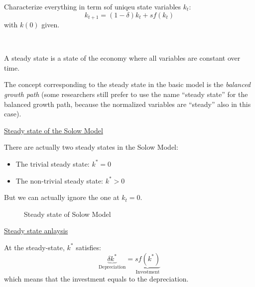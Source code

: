 Characterize everything in term sof uniqeu state variables $k_t$:
\[k_{t+1} = (1 - \delta)k_t + sf(k_t)\]
with $k(0)$ given.

\begin{definition}
    \

    A steady state is a state of the economy where all variables are constant over time.

    The concept corresponding to the steady state in the basic model is the \textit{balanced 
    growth path} (some researchers still prefer to use the name “steady state” for the balanced 
    growth path, because the normalized variables are “steady” also in this case).
\end{definition}

\underline{Steady state of the Solow Model}

There are actually two steady states in the Solow Model:
\begin{itemize}
    \item The trivial steady state: $k^* = 0$
    \item The non-trivial steady state: $k^* > 0$
\end{itemize}
But we can actually ignore the one at $k_t = 0$.

\begin{figure}[!htbp]
    \centering
    \caption{Steady state of Solow Model}
\end{figure}

\underline{Steady state anlaysis}

At the steady-state, $k^*$ satisfies:
\[\underset{\text{Depreciation}}{\underbrace{\delta k^*}} = \underset{\text{Investment}}{\underbrace{sf(k^*)}} \]
which means that the investment equals to the depreciation.

